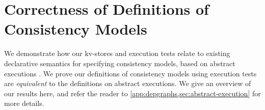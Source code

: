 \section{Correctness of Definitions of Consistency Models}
\label{sec:other_formalisms}

We demonstrate how our kv-stores and execution 
tests relate to existing declarative semantics for specifying  
consistency models, based on abstract executions \cite{framework-concur}. 
We prove our definitions of consistency models using execution tests
are \emph{equivalent} to the definitions on abstract executions.
We give an overview of our results here, and refer the reader to \cref{app:depgraphs,sec:abstract-execution}
for more details.


